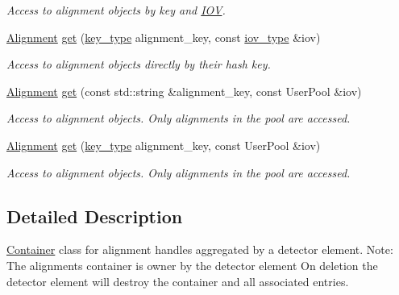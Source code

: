 \begin{DoxyCompactItemize}
\begin{DoxyCompactList}\small\item\em Access to alignment objects by key and \hyperlink{class_d_d4hep_1_1_i_o_v}{IOV}. \item\end{DoxyCompactList}\item 
\hyperlink{class_d_d4hep_1_1_alignments_1_1_alignment}{Alignment} \hyperlink{class_d_d4hep_1_1_alignments_1_1_container_a9ce366840ca326bf5258e6ac94537048}{get} (\hyperlink{class_d_d4hep_1_1_alignments_1_1_container_a4101ffa946cedbaf996682533e57c44e}{key\_\-type} alignment\_\-key, const \hyperlink{class_d_d4hep_1_1_i_o_v}{iov\_\-type} \&iov)
\begin{DoxyCompactList}\small\item\em Access to alignment objects directly by their hash key. \item\end{DoxyCompactList}\item 
\hyperlink{class_d_d4hep_1_1_alignments_1_1_alignment}{Alignment} \hyperlink{class_d_d4hep_1_1_alignments_1_1_container_aea9d9f1fddacb999c394add07ff9fd67}{get} (const std::string \&alignment\_\-key, const UserPool \&iov)
\begin{DoxyCompactList}\small\item\em Access to alignment objects. Only alignments in the pool are accessed. \item\end{DoxyCompactList}\item 
\hyperlink{class_d_d4hep_1_1_alignments_1_1_alignment}{Alignment} \hyperlink{class_d_d4hep_1_1_alignments_1_1_container_a36da0db1c28a345f4363738dca05c023}{get} (\hyperlink{class_d_d4hep_1_1_alignments_1_1_container_a4101ffa946cedbaf996682533e57c44e}{key\_\-type} alignment\_\-key, const UserPool \&iov)
\begin{DoxyCompactList}\small\item\em Access to alignment objects. Only alignments in the pool are accessed. \item\end{DoxyCompactList}\end{DoxyCompactItemize}


\subsection{Detailed Description}
\hyperlink{class_d_d4hep_1_1_alignments_1_1_container}{Container} class for alignment handles aggregated by a detector element. Note: The alignments container is owner by the detector element On deletion the detector element will destroy the container and all associated entries.

